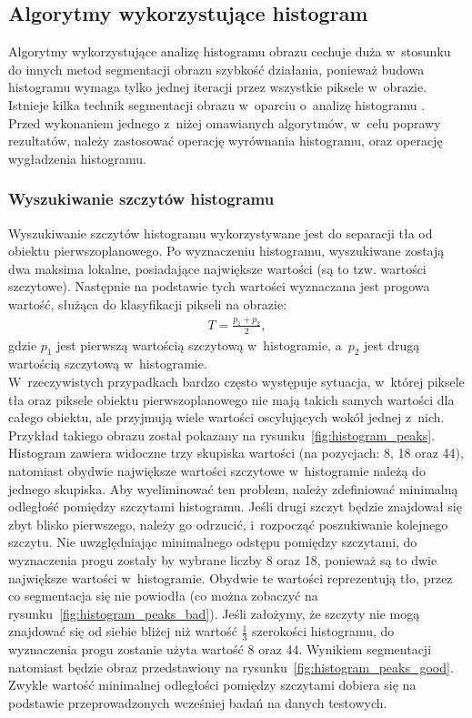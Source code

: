\subsection{Algorytmy wykorzystujące histogram}
Algorytmy wykorzystujące analizę histogramu obrazu cechuje duża w~stosunku do innych metod segmentacji obrazu szybkość działania, ponieważ budowa histogramu wymaga tylko jednej iteracji przez wszystkie piksele w~obrazie. Istnieje kilka technik segmentacji obrazu w~oparciu o~analizę histogramu \cite{phillips93}. \\
Przed wykonaniem jednego z~niżej omawianych algorytmów, w~celu poprawy rezultatów, należy zastosować operację wyrównania histogramu, oraz operację wygładzenia histogramu.

\subsubsection{Wyszukiwanie szczytów histogramu}\label{sssec:histogram_peaks}
Wyszukiwanie szczytów histogramu wykorzystywane jest do separacji tła od obiektu pierwszoplanowego. Po wyznaczeniu histogramu, wyszukiwane zostają dwa maksima lokalne, posiadające największe wartości (są to tzw. wartości szczytowe). Następnie na podstawie tych wartości wyznaczana jest progowa wartość, służąca do klasyfikacji pikseli na obrazie:
\begin{gather*}
  T = \frac{p_1 + p_2}{2},
\end{gather*}
gdzie $p_1$ jest pierwszą wartością szczytową w~histogramie, a~$p_2$ jest drugą wartością szczytową w~histogramie. \\
 W~rzeczywistych przypadkach bardzo często występuje sytuacja, w~której piksele tła oraz piksele obiektu pierwszoplanowego nie mają takich samych wartości dla całego obiektu, ale przyjmują wiele wartości oscylujących wokół jednej z~nich. Przykład takiego obrazu został pokazany na rysunku~\ref{fig:histogram_peaks}. Histogram zawiera widoczne trzy skupiska wartości (na pozycjach: 8, 18 oraz 44), natomiast obydwie największe wartości szczytowe w~histogramie należą do jednego skupiska. Aby wyeliminować ten problem, należy zdefiniować minimalną odległość pomiędzy szczytami histogramu. Jeśli drugi szczyt będzie znajdował się zbyt blisko pierwszego, należy go odrzucić, i~rozpocząć poszukiwanie kolejnego szczytu. Nie uwzględniając minimalnego odstępu pomiędzy szczytami, do wyznaczenia progu zostały by wybrane liczby 8 oraz 18, ponieważ są to dwie największe wartości w~histogramie. Obydwie te wartości reprezentują tło, przez co segmentacja się nie powiodła (co można zobaczyć na rysunku~\ref{fig:histogram_peaks_bad}). Jeśli założymy, że szczyty nie mogą znajdować się od siebie bliżej niż wartość $\frac{1}{3}$ szerokości histogramu, do wyznaczenia progu zostanie użyta wartość 8 oraz 44. Wynikiem segmentacji natomiast będzie obraz przedstawiony na rysunku~\ref{fig:histogram_peaks_good}. Zwykle wartość minimalnej odległości pomiędzy szczytami dobiera się na podstawie przeprowadzonych wcześniej badań na danych testowych.
